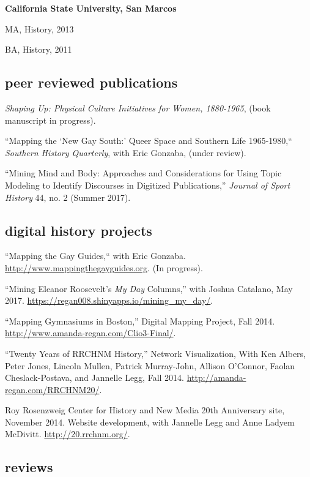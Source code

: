 \documentclass[11pt]{article}
\begin{document}
\vspace{0.05in}

\textbf{California State University, San Marcos}

\hfill\begin{minipage}{6.25in}
MA, History, 2013

\vspace{0.10in}
BA, History, 2011


\end{minipage}


\subsection{peer reviewed publications}\label{peer-reviewed}

\emph{Shaping Up: Physical Culture Initiatives for Women, 1880-1965}, (book manuscript in progress).

``Mapping the `New Gay South:' Queer Space and Southern Life 1965-1980,`` \emph{Southern History Quarterly}, with Eric Gonzaba, (under review).

``Mining Mind and Body: Approaches and Considerations for Using Topic Modeling to Identify Discourses in Digitized Publications,'' \emph{Journal of Sport History} 44, no. 2 (Summer 2017).

\subsection{digital history projects}
``Mapping the Gay Guides,`` with Eric Gonzaba. \url{http://www.mappingthegayguides.org}. (In progress).

``Mining Eleanor Roosevelt's \emph{My Day} Columns,'' with Joshua Catalano, May 2017. \url{https://regan008.shinyapps.io/mining_my_day/}.

``Mapping Gymnasiums in Boston,'' Digital Mapping Project, Fall 2014. \url{http://www.amanda-regan.com/Clio3-Final/}.

``Twenty Years of RRCHNM History,'' Network Visualization, With Ken Albers, Peter Jones, Lincoln Mullen, Patrick Murray-John, Allison O’Connor, Faolan Cheslack-Postava, and Jannelle Legg, Fall 2014. \url{http://amanda-regan.com/RRCHNM20/}.

Roy Rosenzweig Center for History and New Media 20th Anniversary site, November 2014. Website development, with Jannelle Legg and Anne Ladyem McDivitt. \url{http://20.rrchnm.org/}.


\subsection{reviews}\label{reviews}
\end{document}
